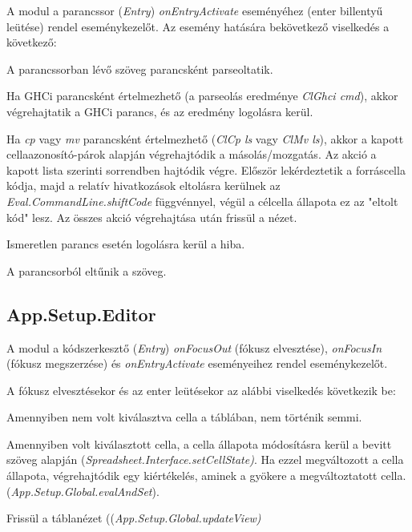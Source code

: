 A modul a parancssor (\textit{Entry}) \textit{onEntryActivate} eseményéhez (enter billentyű leütése) rendel eseménykezelőt. Az esemény hatására bekövetkező viselkedés a következő:
\begin{compactenum}
	\item A parancssorban lévő szöveg parancsként parseoltatik.
	\item Ha GHCi parancsként értelmezhető (a parseolás eredménye \textit{ClGhci cmd}), akkor végrehajtatik a GHCi parancs, és az eredmény logolásra kerül.
	\item Ha \textit{cp} vagy \textit{mv} parancsként értelmezhető (\textit{ClCp ls} vagy \textit{ClMv ls}), akkor a kapott cellaazonosító-párok alapján végrehajtódik a másolás/mozgatás. Az akció a kapott lista szerinti sorrendben hajtódik végre. Először lekérdeztetik a forráscella kódja, majd a relatív hivatkozások eltolásra kerülnek az \textit{Eval.CommandLine.shiftCode} függvénnyel, végül a célcella állapota ez az "eltolt kód" lesz. Az összes akció végrehajtása után frissül a nézet.
	\item Ismeretlen parancs esetén logolásra kerül a hiba.
	\item A parancsorból eltűnik a szöveg.
\end{compactenum}

\subsection{App.Setup.Editor}

A modul a kódszerkesztő (\textit{Entry}) \textit{onFocusOut} (fókusz elvesztése), \textit{onFocusIn} (fókusz megszerzése) és \textit{onEntryActivate} eseményeihez rendel eseménykezelőt.

A fókusz elvesztésekor és az enter leütésekor az alábbi viselkedés következik be:
\begin{compactenum}
	\item Amennyiben nem volt kiválasztva cella a táblában, nem történik semmi.
	\item Amennyiben volt kiválasztott cella, a cella állapota módosításra kerül a bevitt szöveg alapján (\mbox{\textit{Spreadsheet.Interface.setCellState)}}. Ha ezzel megváltozott a cella állapota, végrehajtódik egy kiértékelés, aminek a gyökere a megváltoztatott cella. (\mbox{\textit{App.Setup.Global.evalAndSet}}).
	\item Frissül a táblanézet ((\mbox{\textit{App.Setup.Global.updateView)}}
\end{compactenum}

